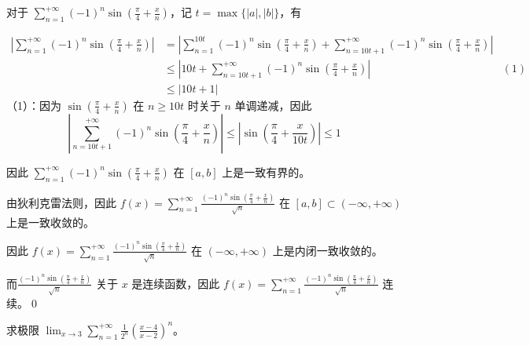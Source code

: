 对于 $\displaystyle \sum _{n=1}^{+\infty }( -1)^{n}\sin\left(\frac{\pi }{4} +\frac{x}{n}\right)$，记 $\displaystyle t=\max\{|a|,|b|\}$，有 


\begin{align*}
	\left| \sum _{n=1}^{+\infty }( -1)^{n}\sin\left(\frac{\pi }{4} +\frac{x}{n}\right)\right|  & =\left| \sum _{n=1}^{10t}( -1)^{n}\sin\left(\frac{\pi }{4} +\frac{x}{n}\right) +\sum _{n=10t+1}^{+\infty }( -1)^{n}\sin\left(\frac{\pi }{4} +\frac{x}{n}\right)\right|  & \\
	& \leqslant \left| 10t+\sum _{n=10t+1}^{+\infty }( -1)^{n}\sin\left(\frac{\pi }{4} +\frac{x}{n}\right)\right|  & ( 1)\\
	& \leqslant |10t+1| & 
\end{align*}
（1）：因为 $\displaystyle \sin\left(\frac{\pi }{4} +\frac{x}{n}\right)$ 在 $\displaystyle n\geqslant 10t$ 时关于 $\displaystyle n$ 单调递减，因此
\begin{equation*}
	\left| \sum _{n=10t+1}^{+\infty }( -1)^{n}\sin\left(\frac{\pi }{4} +\frac{x}{n}\right)\right| \leqslant \left| \sin\left(\frac{\pi }{4} +\frac{x}{10t}\right)\right| \leqslant 1
\end{equation*}


因此 $\displaystyle \sum _{n=1}^{+\infty }( -1)^{n}\sin\left(\frac{\pi }{4} +\frac{x}{n}\right)$ 在 $\displaystyle [ a,b]$ 上是一致有界的。

由狄利克雷法则，因此 $\displaystyle f( x) =\sum _{n=1}^{+\infty }\frac{( -1)^{n}\sin\left(\frac{\pi }{4} +\frac{x}{n}\right)}{\sqrt{n}}$ 在 $\displaystyle [ a,b] \subset ( -\infty ,+\infty )$ 上是一致收敛的。

因此 $\displaystyle f( x) =\sum _{n=1}^{+\infty }\frac{( -1)^{n}\sin\left(\frac{\pi }{4} +\frac{x}{n}\right)}{\sqrt{n}}$ 在 $\displaystyle ( -\infty ,+\infty )$ 上是内闭一致收敛的。

而$\displaystyle \frac{( -1)^{n}\sin\left(\frac{\pi }{4} +\frac{x}{n}\right)}{\sqrt{n}}$ 关于 $\displaystyle x$ 是连续函数，因此 $\displaystyle f( x) =\sum _{n=1}^{+\infty }\frac{( -1)^{n}\sin\left(\frac{\pi }{4} +\frac{x}{n}\right)}{\sqrt{n}}$ 连续。\qed 





\begin{ques}
	求极限 $\displaystyle \lim _{x\rightarrow 3}\sum _{n=1}^{+\infty }\frac{1}{2^{n}}\left(\frac{x-4}{x-2}\right)^{n}$。
\end{ques}



